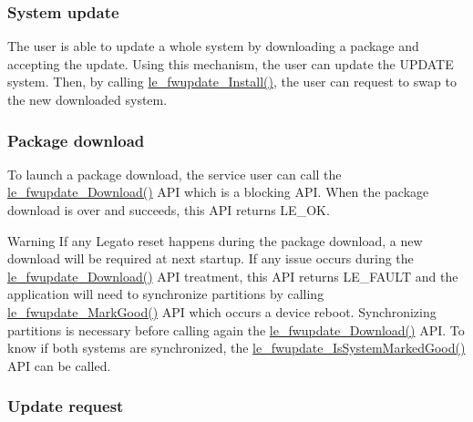 \begin{center}  \end{center} \hypertarget{platformConstraintsDualSys_fwupdateConstrain_SystemUpdate}{}\subsubsection{System update}\label{platformConstraintsDualSys_fwupdateConstrain_SystemUpdate}
The user is able to update a whole system by downloading a package and accepting the update. Using this mechanism, the user can update the U\+P\+D\+A\+TE system. Then, by calling \hyperlink{le__fwupdate__interface_8h_a534e72fc1a6c20a36a9bdf4a58074159}{le\+\_\+fwupdate\+\_\+\+Install()}, the user can request to swap to the new downloaded system.\hypertarget{platformConstraintsDualSys_fwupdateConstrain_PackageDownload}{}\subsubsection{Package download}\label{platformConstraintsDualSys_fwupdateConstrain_PackageDownload}
To launch a package download, the service user can call the \hyperlink{le__fwupdate__interface_8h_ab68f3a7c5d4284306468e888bf6a8796}{le\+\_\+fwupdate\+\_\+\+Download()} A\+PI which is a blocking A\+PI. When the package download is over and succeeds, this A\+PI returns L\+E\+\_\+\+OK. \begin{DoxyWarning}{Warning}
If any Legato reset happens during the package download, a new download will be required at next startup. If any issue occurs during the \hyperlink{le__fwupdate__interface_8h_ab68f3a7c5d4284306468e888bf6a8796}{le\+\_\+fwupdate\+\_\+\+Download()} A\+PI treatment, this A\+PI returns L\+E\+\_\+\+F\+A\+U\+LT and the application will need to synchronize partitions by calling \hyperlink{le__fwupdate__interface_8h_ad153c293ff605e7aef51929c873e2792}{le\+\_\+fwupdate\+\_\+\+Mark\+Good()} A\+PI which occurs a device reboot. Synchronizing partitions is necessary before calling again the \hyperlink{le__fwupdate__interface_8h_ab68f3a7c5d4284306468e888bf6a8796}{le\+\_\+fwupdate\+\_\+\+Download()} A\+PI. To know if both systems are synchronized, the \hyperlink{le__fwupdate__interface_8h_aafc80ed054d69c6d159933093bb13ff7}{le\+\_\+fwupdate\+\_\+\+Is\+System\+Marked\+Good()} A\+PI can be called.
\end{DoxyWarning}
\hypertarget{platformConstraintsDualSys_fwupdateConstrain_UpdateReq}{}\subsubsection{Update request}\label{platformConstraintsDualSys_fwupdateConstrain_UpdateReq}
